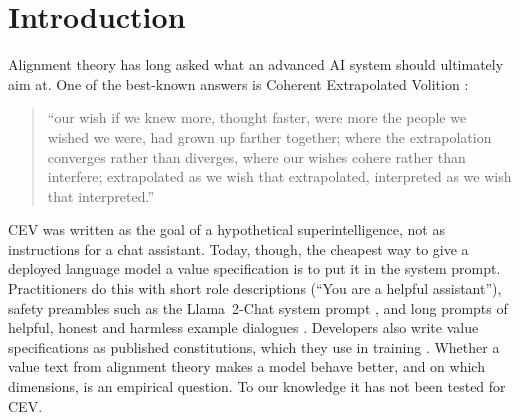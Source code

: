 \section{Introduction}
\label{sec:intro}

Alignment theory has long asked what an advanced AI system should ultimately aim at. One of the best-known answers is
Coherent Extrapolated Volition \citep{yudkowsky2004cev}:
\begin{quote}\small
``our wish if we knew more, thought faster, were more the people we wished we were, had grown up farther together;
where the extrapolation converges rather than diverges, where our wishes cohere rather than interfere; extrapolated as
we wish that extrapolated, interpreted as we wish that interpreted.''
\end{quote}
CEV was written as the goal of a hypothetical superintelligence, not as instructions for a chat assistant. Today,
though, the cheapest way to give a deployed language model a value specification is to put it in the system prompt.
Practitioners do this with short role descriptions (``You are a helpful assistant''), safety preambles such as the
Llama~2-Chat system prompt \citep{touvron2023llama2}, and long prompts of helpful, honest and harmless example dialogues
\citep{askell2021general}. Developers also write value specifications as published constitutions, which they use in
training \citep{bai2022constitutional,anthropic2026constitution}. Whether a value text from alignment theory makes a model behave better, and on which
dimensions, is an empirical question. To our knowledge it has not been tested for CEV.

